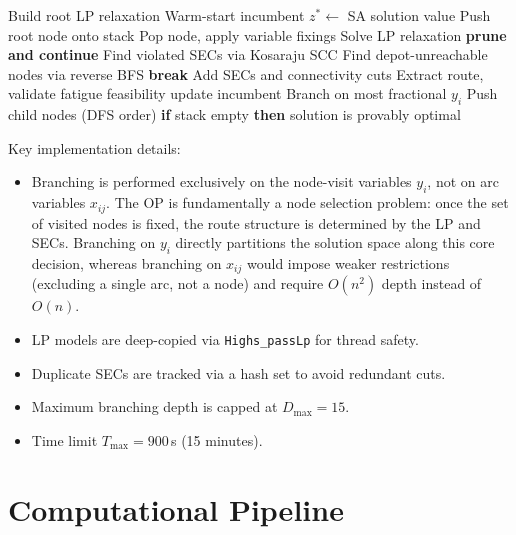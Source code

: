 \documentclass[11pt,a4paper]{article}
\begin{document}
\begin{algorithm}[H]
\caption{Branch-and-Cut for AOPF}
\label{alg:bnc}
\begin{algorithmic}[1]
\State Build root LP relaxation
\State Warm-start incumbent $z^* \gets$ SA solution value
\State Push root node onto stack
  \State Pop node, apply variable fixings
   
    \State Solve LP relaxation
     \textbf{prune and continue} \EndIf
    \State Find violated SECs via Kosaraju SCC
    \State Find depot-unreachable nodes via reverse BFS
     \textbf{break} \EndIf
    \State Add SECs and connectivity cuts
  \EndFor
    \State Extract route, validate fatigue feasibility
     update incumbent \EndIf
  \Else
    \State Branch on most fractional $y_i$
    \State Push child nodes (DFS order)
  \EndIf
\EndWhile
\State \textbf{if} stack empty \textbf{then} solution is provably optimal
\end{algorithmic}
\end{algorithm}

Key implementation details:
\begin{itemize}[nosep]
  \item Branching is performed exclusively on the node-visit variables $y_i$, not on arc variables $x_{ij}$.
        The OP is fundamentally a node selection problem: once the set of visited nodes is fixed, the route structure is determined by the LP and SECs.
        Branching on $y_i$ directly partitions the solution space along this core decision, whereas branching on $x_{ij}$ would impose weaker restrictions (excluding a single arc, not a node) and require $O(n^2)$ depth instead of $O(n)$.
  \item LP models are deep-copied via \texttt{Highs\_passLp} for thread safety.
  \item Duplicate SECs are tracked via a hash set to avoid redundant cuts.
  \item Maximum branching depth is capped at $D_{\max} = 15$.
  \item Time limit $T_{\max} = 900$\,s (15 minutes).
\end{itemize}

\section{Computational Pipeline}
\label{sec:pipeline}
\end{document}
